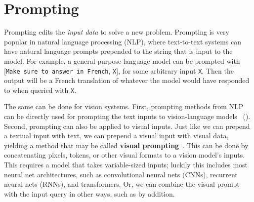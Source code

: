 





\section{Prompting}

Prompting edits the \textit{input data} to solve a new problem. Prompting is very popular in natural language processing (NLP), where text-to-text systems can have natural language prompts prepended to the string that is input to the model. For example, a general-purpose language model can be prompted with [\texttt{Make sure to answer in French}, \texttt{X}], for some arbitrary input \texttt{X}. Then the output will be a French translation of whatever the model would have responded to when queried with \texttt{X}.

The same can be done for vision systems. First, prompting methods from NLP can be directly used for prompting the text inputs to vision-language models~\cite{radford2021learning} (\sect{\ref{sec:VLMs:CLIP}}). Second, prompting can also be applied to visual inputs. Just like we can prepend a textual input with text, we can prepend a visual input with visual data, yielding a method that may be called \textbf{visual prompting}~\cite{bahng2022exploring,bar2022visual,jia2022visual}. This can be done by concatenating pixels, tokens, or other visual formats to a vision model's inputs. This requires a model that takes variable-sized inputs; luckily this includes most neural net architectures, such as convolutional neural nets (CNNs), recurrent neural nets (RNNs), and transformers. Or, we can combine the visual prompt with the input query in other ways, such as by addition. 

